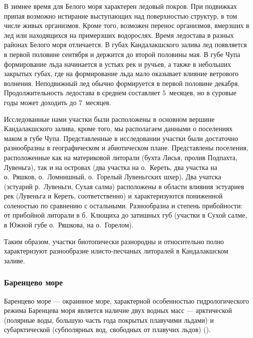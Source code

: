 В зимнее время для Белого моря характерен ледовый покров. 
При подвижках припая возможно истирание выступающих над поверхностью структур, в том числе живых организмов. 
Кроме того, возможен перенос организмов, вмерзших в лед или находящихся на примерзших водорослях.
 Время ледостава в разных районах Белого моря отличается. 
В губах Кандалакшского залива лед появляется в первой половине сентября и держится до второй половины мая. 
В губе Чупа формирование льда начинается в устьях рек и ручьев, а также в небольших закрытых губах, где на формирование льда мало оказывает влияние ветрового волнения. 
Неподвижный лед обычно формируется в первой половине декабря. 
Продолжительность ледостава в среднем составляет $5$~месяцев, но в суровые годы может доходить до $7$~месяцев. 

Исследованные нами участки были расположены в основном вершине Кандалакшского залива, кроме того, мы располагаем данными о поселениях маком в губе Чупа. 
Представленные в исследовании участки были достаточно разнообразны в географическом и абиотическом плане.
Представлены поселения, расположенные как на материковой литорали (бухта Лисья, пролив Подпахта, Лувеньга), так и на островах (два участка на о.~Кереть, два участка на о.~Ряшков, о.~Ломнишный, о.~Горелый Лувеньгских шхер). 
Два учатска (эстуарий р.~Лувеньги, Сухая салма) расположены в области влияния эстуариев рек (Лувеньга и Кереть, соответственно)  и характеризуются пониженной соленостью по сравнению с остальными.
Разнообразна и степень прибойности: от прибойной литорали в б.~Клющиха до затишных губ (участки в Сухой салме, в Южной губе о.~Ряшкова, на о.~Горелом).

Таким образом, участки биотопически разнородны и относительно полно характеризуют разнообразие илисто-песчаных литоралей в Кандалакшском заливе.

	\subsubsection{Баренцево море}

Баренцево море --- окраинное море, характерной особенностью гидрологического режима Баренцева моря является наличие двух  водных масс --- арктической (полярные воды, большую часть года покрытых плавучими льдами) и субарктической (субполярных вод, свободных от плавучих льдов) (\cite{Adrov_1992}). 


